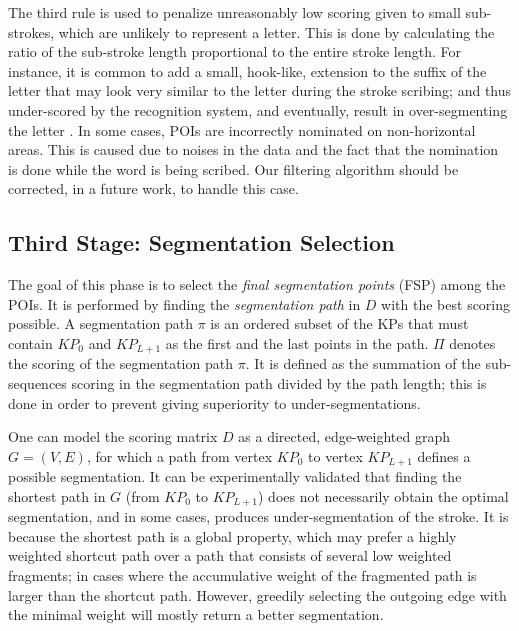 \documentclass[10pt, conference, compsocconf]{IEEEtran}
\begin{document}
The third rule is used to penalize unreasonably low scoring given to small sub-strokes, which are unlikely to represent a letter. 
This is done by calculating the ratio of the sub-stroke length proportional to the entire stroke length.
For instance, it is common to add a small, hook-like, extension to the suffix of the letter  that may look very similar to the letter  during the stroke scribing; and thus under-scored by the recognition system, and eventually, result in over-segmenting the letter . 
In some cases, POIs are incorrectly nominated on non-horizontal areas. 
This is caused due to noises in the data and the fact that the nomination is done while the word is being scribed. 
Our filtering algorithm should be corrected, in a future work, to handle this case.\\

\subsection{Third Stage: Segmentation Selection}
The goal of this phase is to select the \emph{final segmentation points} (FSP) among the POIs. 
It is performed by finding the \emph{segmentation path} in $D$ with the best scoring possible. 
A segmentation path $\pi$ is an ordered subset of the KPs that must contain $KP_{0}$ and $KP_{L+1}$ as the first and the last points in the path.
$\Pi$ denotes the scoring of the segmentation path $\pi$. 
It is defined as the summation of the sub-sequences scoring in the segmentation path divided by the path length; this is done in order to prevent giving superiority to under-segmentations.

One can model the scoring matrix $D$ as a directed, edge-weighted graph $G=(V,E)$, for which a path from vertex $KP_0$ to vertex $KP_{L+1}$ defines a possible segmentation. 
It can be experimentally validated that finding the shortest path in $G$ (from $KP_0$ to $KP_{L+1}$) does not necessarily obtain the optimal segmentation, and in some cases, produces under-segmentation of the stroke. 
It is because the shortest path is a global property, which may prefer a highly weighted shortcut path over a path that consists of several low weighted fragments; in cases where the accumulative weight of the fragmented path is larger than the shortcut path.
However, greedily selecting the outgoing edge with the minimal weight will mostly return a better segmentation.
\end{document}
